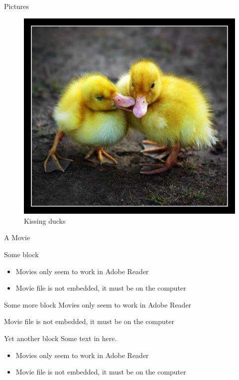 \documentclass[a4paper, utf8, handout]{beamer}
\begin{document}
\begin{frame}
  {Pictures}

  \begin{figure}[t]
    \centering
    \includegraphics[height=\dimexpr11\textheight/16\relax]{ducks}
    \caption{Kissing ducks}
  \end{figure}
\end{frame}


\begin{frame}
  {A Movie}

  \begin{block}{Some block}
    \begin{itemize}
    \item Movies only seem to work in Adobe Reader
    \item Movie file is not embedded, it must be on the computer
    \end{itemize}
  \end{block}

  \begin{exampleblock}{Some more block}
    Movies only seem to work in Adobe Reader\par
    Movie file is not embedded, it must be on the computer
  \end{exampleblock}

  \begin{alertblock}{Yet another block}
    Some text in here.
    \begin{itemize}
    \item Movies only seem to work in Adobe Reader
    \item Movie file is not embedded, it must be on the computer
    \end{itemize}
  \end{alertblock}

\end{frame}
\end{document}
